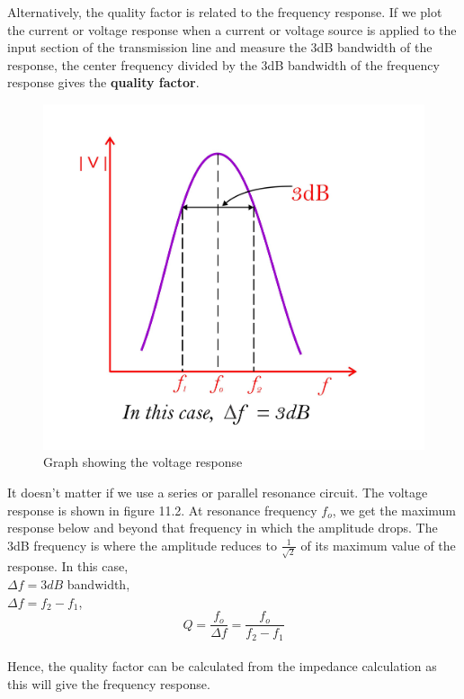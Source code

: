 Alternatively, the quality factor is related to the frequency response. If we plot the current or voltage response when a current or voltage source is applied to the input section of the transmission line and measure the 3dB bandwidth of the response, the center frequency divided by the 3dB bandwidth of the frequency response gives the \textbf{quality factor}. 
\begin{figure}[h]
\centering
\includegraphics[scale=0.6]{./graphics/fig2}
\caption{Graph showing the voltage response}
\end{figure}It doesn't matter if we use a series or parallel resonance circuit. The voltage response is shown in figure 11.2. At resonance frequency $ f_{o} $, we get the maximum response below and beyond that frequency in which the amplitude drops. The 3dB frequency is where the amplitude reduces to $ \frac{1}{\sqrt{2}} $ of its maximum value of the response. In this case,\\ $ \Delta f=3dB $ bandwidth,\\ $ \Delta f=f_{2}-f_{1} $,\\
\begin{equation}
\boxed{	Q=\frac{f_{o}}{\Delta f}=\frac{f_{o}}{f_{2}-f_{1}}}\end{equation}\\
Hence, the quality factor can be calculated from the impedance calculation as this will give the frequency response.\\
